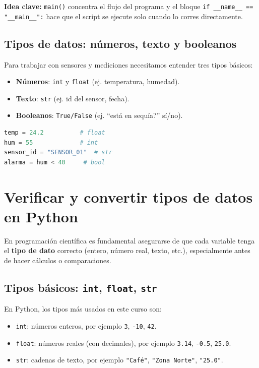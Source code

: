 \documentclass[11pt, a4paper]{article}
\begin{document}
\textbf{Idea clave:} \texttt{main()} concentra el flujo del programa y el bloque
\texttt{if \_\_name\_\_ == "\_\_main\_\_":}
 hace que el script se ejecute solo cuando lo corres directamente.

\subsection{Tipos de datos: números, texto y booleanos}
Para trabajar con sensores y mediciones necesitamos entender tres tipos básicos:

\begin{itemize}
\item \textbf{Números}: \texttt{int} y \texttt{float} (ej. temperatura, humedad).
\item \textbf{Texto}: \texttt{str} (ej. id del sensor, fecha).
\item \textbf{Booleanos}: \texttt{True/False} (ej. ``está en sequía?'' sí/no).
\end{itemize}

\begin{lstlisting}[language=Python, caption={Ejemplo mínimo de tipos}]
temp = 24.2          # float
hum = 55             # int
sensor_id = "SENSOR_01"  # str
alarma = hum < 40     # bool
\end{lstlisting}
\newpage
\section{Verificar y convertir tipos de datos en Python}

En programación científica es fundamental asegurarse de que cada variable tenga el \textbf{tipo de dato} correcto (entero, número real, texto, etc.), especialmente antes de hacer cálculos o comparaciones.

\subsection{Tipos básicos: \texttt{int}, \texttt{float}, \texttt{str}}

En Python, los tipos más usados en este curso son:

\begin{itemize}
    \item \texttt{int}: números enteros, por ejemplo \texttt{3}, \texttt{-10}, \texttt{42}.
    \item \texttt{float}: números reales (con decimales), por ejemplo \texttt{3.14}, \texttt{-0.5}, \texttt{25.0}.
    \item \texttt{str}: cadenas de texto, por ejemplo \texttt{"Café"}, \texttt{"Zona Norte"}, \texttt{"25.0"}.
\end{itemize}
\end{document}
